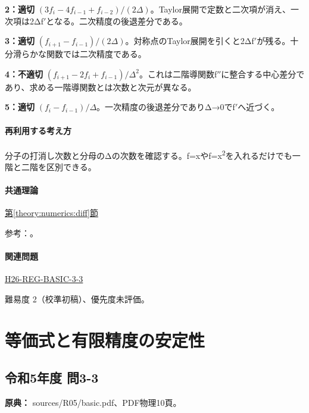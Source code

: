 \noindent\textbf{2：適切} \((3f_i-4f_{i-1}+f_{i-2})/(2\Delta)\)。Taylor展開で定数と二次項が消え、一次項は2Δf\ensuremath{'}となる。二次精度の後退差分である。\par

\noindent\textbf{3：適切} \((f_{i+1}-f_{i-1})/(2\Delta)\)。対称点のTaylor展開を引くと2Δf\ensuremath{'}が残る。十分滑らかな関数では二次精度である。\par

\noindent\textbf{4：不適切} \((f_{i+1}-2f_i+f_{i-1})/\Delta^2\)。これは二階導関数f\ensuremath{''}に整合する中心差分であり、求める一階導関数とは次数と次元が異なる。\par

\noindent\textbf{5：適切} \((f_i-f_{i-1})/\Delta\)。一次精度の後退差分でありΔ→0でf\ensuremath{'}へ近づく。\par

\paragraph{再利用する考え方} 分子の打消し次数と分母のΔの次数を確認する。f=\allowbreak{}xやf=\allowbreak{}x\textsuperscript{2}を入れるだけでも一階と二階を区別できる。

\paragraph{共通理論} \hyperref[theory:numerics:diff]{第\ref*{theory:numerics:diff}節}

\par 参考：\cite{nist_differentiation}。

\paragraph{関連問題} \hyperref[q:h26-reg-basic-3-3]{H26-REG-BASIC-3-3}

\par 難易度 2（校準初稿）、優先度未評価。

\section{等価式と有限精度の安定性}

\subsection{令和5年度 問3-3}
\label{q:r05-reg-basic-3-3}

\noindent\textbf{原典：} sources/R05/basic.pdf、PDF物理10頁。


